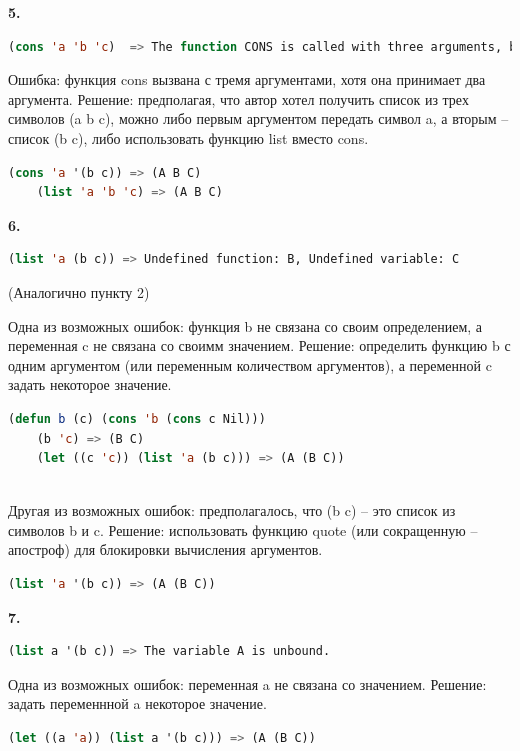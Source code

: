 \documentclass[12pt]{report}
\begin{document}
\clearpage
\textbf{5.}

\begin{lstlisting}[language=Lisp]
	(cons 'a 'b 'c)  => The function CONS is called with three arguments, but wants exactly two.
\end{lstlisting}

Ошибка: функция cons вызвана с тремя аргументами, хотя она принимает два аргумента. Решение: предполагая, что автор хотел получить список из трех символов  (a b c), можно либо первым аргументом передать символ a, а вторым -- список (b c), либо использовать функцию list вместо cons.


\begin{lstlisting}[language=Lisp]
	(cons 'a '(b c)) => (A B C)
	(list 'a 'b 'c) => (A B C)
\end{lstlisting}




\textbf{6.} 
\begin{lstlisting}[language=Lisp]
	(list 'a (b c)) => Undefined function: B, Undefined variable: C
\end{lstlisting}

(Аналогично пункту 2)

Одна из возможных ошибок: функция b не связана со своим определением, а переменная c не связана со своимм значением. Решение: определить функцию b с одним аргументом (или переменным количеством аргументов), а переменной c задать некоторое значение.
\begin{lstlisting}[language=Lisp]
	(defun b (c) (cons 'b (cons c Nil)))
	(b 'c) => (B C)
	(let ((c 'c)) (list 'a (b c))) => (A (B C))
	
\end{lstlisting}

Другая из возможных ошибок: предполагалось, что (b c) -- это список из символов b и c. Решение: использовать функцию quote (или сокращенную -- апостроф) для блокировки вычисления аргументов.
\begin{lstlisting}[language=Lisp]
	(list 'a '(b c)) => (A (B C))
\end{lstlisting}







\textbf{7.} 
\begin{lstlisting}[language=Lisp]
	(list a '(b c)) => The variable A is unbound.
\end{lstlisting}

Одна из возможных ошибок: переменная a не связана со значением. Решение: задать переменнной a некоторое значение.
\begin{lstlisting}[language=Lisp]
	(let ((a 'a)) (list a '(b c))) => (A (B C))
\end{lstlisting}
\end{document}
